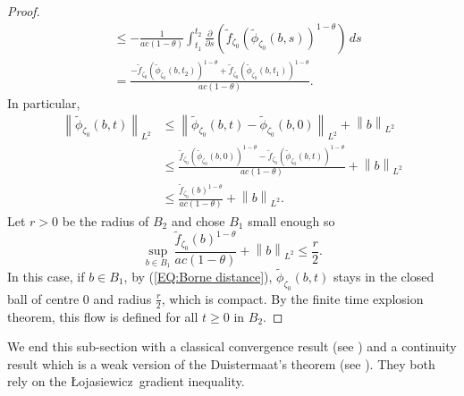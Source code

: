 \documentclass{article}
\theoremstyle{remark}
\theoremstyle{definition}
\newcommand{\norme}[1]{\left\| #1 \right\|}
\newcommand{\Lo}{Łojasiewicz}
\renewcommand{\leq}{\leqslant}
\renewcommand{\geq}{\geqslant}
\begin{document}
\begin{proof}
\begin{align}
    & \leq -\frac{1}{ac(1 - \theta)}\int_{t_1}^{t_2} \frac{\partial}{\partial s}(\tilde{f}_{\zeta_0}(\tilde{\phi}_{\zeta_0}(b,s))^{1 - \theta}) \, ds \nonumber\\
    & = \frac{-\tilde{f}_{\zeta_0}(\tilde{\phi}_{\zeta_0}(b,t_2))^{1 - \theta} + \tilde{f}_{\zeta_0}(\tilde{\phi}_{\zeta_0}(b,t_1))^{1 - \theta}}{ac(1 - \theta)}.
\end{align}
In particular,
\begin{align}
    \norme{\tilde{\phi}_{\zeta_0}(b,t)}_{L^2} & \leq \norme{\tilde{\phi}_{\zeta_0}(b,t) - \tilde{\phi}_{\zeta_0}(b,0)}_{L^2} + \norme{b}_{L^2} \nonumber\\
    & \leq \frac{\tilde{f}_{\zeta_0}(\tilde{\phi}_{\zeta_0}(b,0))^{1 - \theta} - \tilde{f}_{\zeta_0}(\tilde{\phi}_{\zeta_0}(b,t))^{1 - \theta}}{ac(1 - \theta)} + \norme{b}_{L^2} \nonumber\\
    & \leq \frac{\tilde{f}_{\zeta_0}(b)^{1 - \theta}}{ac(1 - \theta)} + \norme{b}_{L^2}. \label{EQ:Borne distance}
\end{align}
Let $r > 0$ be the radius of $B_2$ and chose $B_1$ small enough so
$$
\sup_{b \in B_1} \frac{\tilde{f}_{\zeta_0}(b)^{1 - \theta}}{ac(1 - \theta)} + \norme{b}_{L^2} \leq \frac{r}{2}.
$$
In this case, if $b \in B_1$, by (\ref{EQ:Borne distance}), $\tilde{\phi}_{\zeta_0}(b,t)$ stays in the closed ball of centre $0$ and radius $\frac{r}{2}$, which is compact. By the finite time explosion theorem, this flow is defined for all $t \geq 0$ in $B_2$.
\end{proof}

We end this sub-section with a classical convergence result (see \cite[Theorem 3.3]{GRS}) and a continuity result which is a weak version of the Duistermaat's theorem (see \cite[Theorem 1.1]{Lerman}). They both rely on the \Lo\ gradient inequality.
\end{document}
